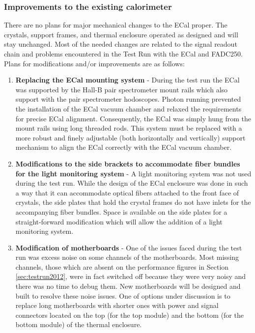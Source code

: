 \subsubsection{Improvements to the existing calorimeter}

There are no plans for major mechanical changes to the ECal proper. The crystals, support frames, and thermal enclosure operated as designed and will stay unchanged. Most of the needed changes are related to the signal readout chain and problems encountered in the Test Run with the ECal and FADC250. Plans for  
modifications and/or improvements are as follows: 

\begin{enumerate}
\item {\bf Replacing the ECal mounting system} - 
During the test run the ECal was supported by the Hall-B pair spectrometer mount rails which also support with the pair spectrometer hodoscopes. 
Photon running prevented the installation of the ECal vacuum chamber and relaxed the requirements for precise ECal alignment. Consequently, the ECal was simply hung from the mount rails using  long threaded rods. This system must be replaced with a more robust and finely adjustable (both horizontally and vertically) support mechanism to  align the  ECal correctly with the ECal vacuum chamber.

\item {\bf Modifications to the side brackets to accommodate fiber bundles for the light monitoring system} -
A light monitoring system was not used during the test run. While the design of the ECal enclosure was done in such a way that it can 
accommodate optical fibers attached to the front face of crystals, the side plates that hold the crystal frames do not have inlets for the accompanying fiber bundles.
Space is available on the side plates for a straight-forward modification which will allow the addition of a light monitoring system.  
    
\item {\bf Modification of motherboards} - One of the issues  faced during the test run was excess noise on some channels of the motherboards. 
Most missing channels, those which are absent on the performance figures in Section \ref{sec:testrun2012}, were in fact switched off because they were very noisy and there was no time to debug them. New motherboards will be designed and built to resolve these noise issues. One of options under discussion is to replace long motherboards with shorter ones with power and signal connectors 
located on the top (for the top module) and the bottom (for the bottom module) of the thermal enclosure. 


\end{enumerate}
